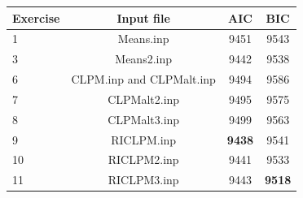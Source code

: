 \documentclass[
]{book}
\begin{document}
\begin{longtable}[]{@{}lccc@{}}
\toprule
Exercise & Input file & AIC & BIC \\
\midrule
\endhead
1 & Means.inp & 9451 & 9543 \\
3 & Means2.inp & 9442 & 9538 \\
6 & CLPM.inp and CLPMalt.inp & 9494 & 9586 \\
7 & CLPMalt2.inp & 9495 & 9575 \\
8 & CLPMalt3.inp & 9499 & 9563 \\
9 & RICLPM.inp & \textbf{9438} & 9541 \\
10 & RICLPM2.inp & 9441 & 9533 \\
11 & RICLPM3.inp & 9443 & \textbf{9518} \\
\bottomrule
\end{longtable}
\end{document}
